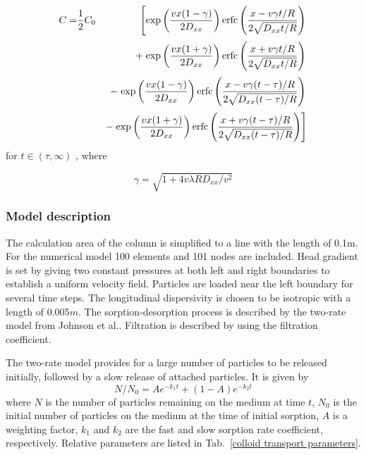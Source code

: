 \begin{eqnarray}\label{colloid analytical 2}
C = & \frac{1}{2} C_0 &
\mbox{\hspace{-1.5ex}} \mbox{\hspace{-1.5ex}}
\left[
\exp
\left(
\frac{v x(1-\gamma)}{2 D_{xx}}
\right)
\mathrm{erfc}
\left(
\frac{x-v \gamma t/R}{2 \sqrt{D_{xx} t/R}}
\right)
\right. \nonumber\\[0.5ex]
& &
+\left.
\exp
\left(
\frac{v x(1+\gamma)}{2 D_{xx}}
\right)
\mathrm{erfc}
\left(
\frac{x + v \gamma t/R}{2 \sqrt{D_{xx} t/R}}
\right)
\right. \nonumber\\[0.5ex]
& &
-\left.
\exp
\left(
\frac{v x(1-\gamma)}{2 D_{xx}}
\right)
\mathrm{erfc}
\left(
\frac{x - v\gamma (t - \tau)/R}{2 \sqrt{D_{xx} (t - \tau)/R}}
\right)
\right. \nonumber\\[0.5ex]
& &
-\left.
\exp
\left(
\frac{v x(1+\gamma)}{2 D_{xx}}
\right)
\mathrm{erfc}
\left(
\frac{x + v \gamma (t - \tau)/R}{2 \sqrt{D_{xx} (t - \tau)/R}}
\right)
\right]
\end{eqnarray}
for $t \in (\tau, \infty) $ , where

\begin{equation}\label{colloid analytical 3}
\gamma = \sqrt{1 + 4  v  \lambda  R  D_{xx} / v^2}
\end{equation}

\subsubsection*{Model description}
%
The calculation area of the column is simplified to a line with the length of 0.1m. For the numerical model 100 elements and 101 nodes are included. Head gradient is set by giving two constant pressures at both left and right boundaries to establish a uniform velocity field. Particles are loaded near the left boundary for several time steps. The longitudinal dispersivity is chosen to be isotropic with a length of 0.005$m$. The sorption-desorption process is described by the two-rate model from Johnson et al.\cite{JohBluLog:95}. Filtration is described by using the filtration coefficient. 

The two-rate model provides for a large number of particles to be released initially, followed by a slow release of attached particles. It is given by
\begin{equation}\label{colloid two-rate}
N/N_{0} = A e^{-k_{1}t} + (1-A) e^{-k_{2}t}
\end{equation}
where $N$ is the number of particles remaining on the medium at time $t$, $N_{0}$ is the initial number of particles on the medium at the time of initial sorption, $A$ is a weighting factor, $k_{1}$ and $k_{2}$ are the fast and slow sorption rate coefficient, respectively. Relative parameters are listed in Tab.~\ref{colloid transport parameters}.

